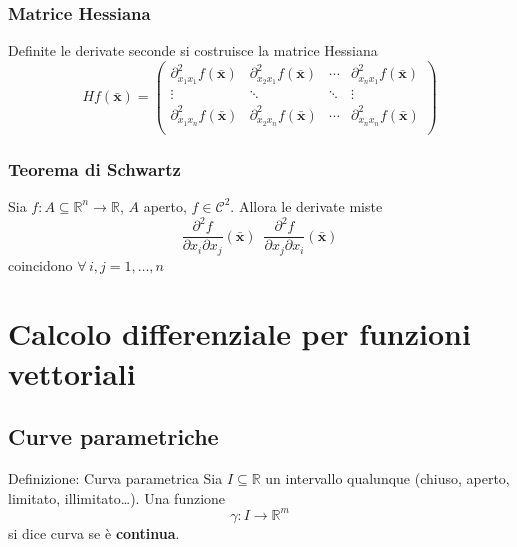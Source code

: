 \documentclass[x11names]{article}
\begin{document}
	\subsubsection{Matrice Hessiana}
	Definite le derivate seconde si costruisce la matrice Hessiana
	\[ 
	Hf(\boldsymbol{\bar{x}}) = \left(\begin{array}{cccc}
		\partial^2_{x_{1}x_{1}}f(\boldsymbol{\bar{x}}) & \partial^2_{x_{2}x_{1}}f(\boldsymbol{\bar{x}}) & \cdots & \partial^2_{x_{n}x_{1}}f(\boldsymbol{\bar{x}}) \\
		\vdots & \ddots & \ddots & \vdots \\
		\partial^2_{x_{1}x_{n}}f(\boldsymbol{\bar{x}}) & \partial^2_{x_{2}x_{n}}f(\boldsymbol{\bar{x}}) & \cdots & \partial^2_{x_{n}x_{n}}f(\boldsymbol{\bar{x}}) \\
	\end{array}\right)
	\]
	
	\begin{center}
		\colorbox{myred}{\begin{minipage}{5.75in}
				\begin{redes}{}
					\subsubsection{Teorema di Schwartz}
					Sia \(f:A\subseteq \mathbb{R}^n \to \mathbb{R}\), \(A\) aperto, \(f \in \mathcal{C}^2\). Allora le derivate miste
					\[ 
					\frac{\partial ^2 f}{\partial x_{i}\partial x_{j}}(\boldsymbol{\bar{x}}) \;\ \frac{\partial ^2 f}{\partial x_{j}\partial x_{i}}(\boldsymbol{\bar{x}})
					\]
					coincidono \(\forall \,i,j = 1,\dots,n\)
				\end{redes}
		\end{minipage}}        
	\end{center}
	
	
	
	
	
	\newpage
	\section{Calcolo differenziale per funzioni vettoriali}
	\subsection{Curve parametriche}
	\begin{center}
		\colorbox{myblue}{\begin{minipage}{5.75in}
				\begin{blues}{Definizione: Curva parametrica}
					Sia \(I \subseteq \mathbb{R}\) un intervallo qualunque (chiuso, aperto, limitato, illimitato\dots). Una funzione
					\[
					\gamma:I\to\mathbb{R}^m
					\]
					si dice curva se è \textbf{continua}.
				\end{blues}
		\end{minipage}}       
	\end{center}
	
\end{document}
